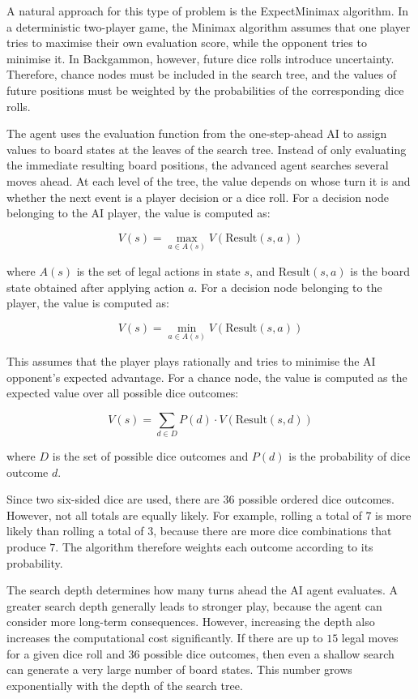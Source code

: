 \documentclass[11pt]{article}
\begin{document}
A natural approach for this type of problem is the ExpectMinimax algorithm. In a deterministic two-player game, the Minimax algorithm assumes that one player tries to maximise their own evaluation score, while the opponent tries to minimise it. In Backgammon, however, future dice rolls introduce uncertainty. Therefore, chance nodes must be included in the search tree, and the values of future positions must be weighted by the probabilities of the corresponding dice rolls.

The agent uses the evaluation function from the one-step-ahead AI to assign values to board states at the leaves of the search tree. Instead of only evaluating the immediate resulting board positions, the advanced agent searches several moves ahead. At each level of the tree, the value depends on whose turn it is and whether the next event is a player decision or a dice roll. For a decision node belonging to the AI player, the value is computed as:

\[ V(s) = \max_{a \in A(s)} V(\text{Result}(s,a)) \]

where \(A(s)\) is the set of legal actions in state \(s\), and \(\text{Result}(s,a)\) is the board state obtained after applying action \(a\). For a decision node belonging to the player, the value is computed as:

\[
V(s) = \min_{a \in A(s)} V(\text{Result}(s,a))
\]

This assumes that the player plays rationally and tries to minimise the AI opponent's expected advantage. For a chance node, the value is computed as the expected value over all possible dice outcomes:

\[
V(s) = \sum_{d \in D} P(d) \cdot V(\text{Result}(s,d))
\]

where \(D\) is the set of possible dice outcomes and \(P(d)\) is the probability of dice outcome \(d\).

Since two six-sided dice are used, there are \(36\) possible ordered dice outcomes. However, not all totals are equally likely. For example, rolling a total of \(7\) is more likely than rolling a total of \(3\), because there are more dice combinations that produce \(7\). The algorithm therefore weights each outcome according to its probability.

The search depth determines how many turns ahead the AI agent evaluates. A greater search depth generally leads to stronger play, because the agent can consider more long-term consequences. However, increasing the depth also increases the computational cost significantly. If there are up to \(15\) legal moves for a given dice roll and \(36\) possible dice outcomes, then even a shallow search can generate a very large number of board states. This number grows exponentially with the depth of the search tree.
\end{document}
